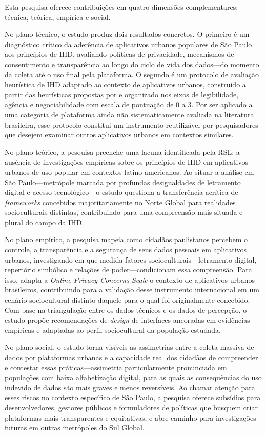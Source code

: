 \documentclass[
	12pt,				%
	oneside,			%
	a4paper,			%
	english,			%
	brazil				%
	]{abntex2ppgsi}
\begin{document}
    Esta pesquisa oferece contribuições em quatro dimensões complementares: técnica, teórica, empírica e social.

    No plano técnico, o estudo produz dois resultados concretos. O primeiro é um diagnóstico crítico da aderência de aplicativos urbanos populares de São Paulo aos princípios de IHD, avaliando políticas de privacidade, mecanismos de consentimento e transparência ao longo do ciclo de vida dos dados---do momento da coleta até o uso final pela plataforma. O segundo é um protocolo de avaliação heurística de IHD adaptado ao contexto de aplicativos urbanos, construído a partir das heurísticas propostas por  e organizado nos eixos de legibilidade, agência e negociabilidade com escala de pontuação de 0 a 3. Por ser aplicado a uma categoria de plataforma ainda não sistematicamente avaliada na literatura brasileira, esse protocolo constitui um instrumento reutilizável por pesquisadores que desejem examinar outros aplicativos urbanos em contextos similares.

    No plano teórico, a pesquisa preenche uma lacuna identificada pela RSL: a ausência de investigações empíricas sobre os princípios de IHD em aplicativos urbanos de uso popular em contextos latino-americanos. Ao situar a análise em São Paulo---metrópole marcada por profundas desigualdades de letramento digital e acesso tecnológico---o estudo questiona a transferência acrítica de \textit{frameworks} concebidos majoritariamente no Norte Global para realidades socioculturais distintas, contribuindo para uma compreensão mais situada e plural do campo da IHD.

    No plano empírico, a pesquisa mapeia como cidadãos paulistanos percebem o controle, a transparência e a segurança de seus dados pessoais em aplicativos urbanos, investigando em que medida fatores socioculturais---letramento digital, repertório simbólico e relações de poder---condicionam essa compreensão. Para isso, adapta a \textit{Online Privacy Concerns Scale} \cite{masur2019situational} o contexto de aplicativos urbanos brasileiros, contribuindo para a validação desse instrumento internacional em um cenário sociocultural distinto daquele para o qual foi originalmente concebido. Com base na triangulação entre os dados técnicos e os dados de percepção, o estudo propõe recomendações de \textit{design} de interfaces ancoradas em evidências empíricas e adaptadas ao perfil sociocultural da população estudada.

    No plano social, o estudo torna visíveis as assimetrias entre a coleta massiva de dados por plataformas urbanas e a capacidade real dos cidadãos de compreender e contestar essas práticas---assimetria particularmente pronunciada em populações com baixa alfabetização digital, para as quais as consequências do uso indevido de dados são mais graves e menos reversíveis. Ao chamar atenção para esses riscos no contexto específico de São Paulo, a pesquisa oferece subsídios para desenvolvedores, gestores públicos e formuladores de políticas que busquem criar plataformas mais transparentes e equitativas, e abre caminho para investigações futuras em outras metrópoles do Sul Global.
\end{document}
